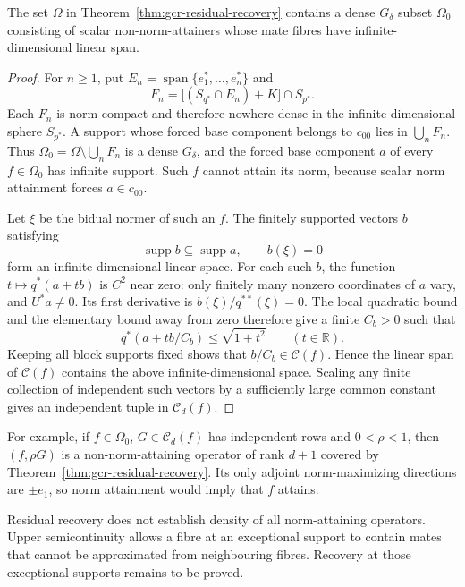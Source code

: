 \documentclass[10pt]{amsart}
\newcommand{\supp}{\operatorname{supp}}
\newcommand{\R}{\mathbb R}
\newcommand{\Cset}{\mathcal C}
\begin{document}
\begin{proposition}
\label{prop:gcr-nonvacuity}
The set $\Omega$ in Theorem~\ref{thm:gcr-residual-recovery}
contains a dense $G_\delta$ subset $\Omega_0$ consisting of
scalar non-norm-attainers whose mate fibres have
infinite-dimensional linear span.
\end{proposition}
\begin{proof}
For $n\ge1$, put $E_n=\operatorname{span}\{e_1^*,\ldots,e_n^*\}$
and
\[
 F_n=\big[(S_{q^*}\cap E_n)+K\big]\cap S_{p^*}.
\]
Each $F_n$ is norm compact and therefore nowhere dense in
the infinite-dimensional sphere $S_{p^*}$. A support whose
forced base component belongs to $c_{00}$ lies in
$\bigcup_nF_n$. Thus
$\Omega_0=\Omega\setminus\bigcup_nF_n$ is a dense $G_\delta$,
and the forced base component $a$ of every $f\in\Omega_0$
has infinite support. Such $f$ cannot attain its norm,
because scalar norm attainment forces $a\in c_{00}$.

Let $\xi$ be the bidual normer of such an $f$.
The finitely supported vectors $b$ satisfying
\[
 \supp b\subseteq\supp a,\qquad b(\xi)=0
\]
form an infinite-dimensional linear space. For each such $b$,
the function $t\mapsto q^*(a+tb)$ is $C^2$ near zero:
only finitely many nonzero coordinates of $a$ vary, and
$U^*a\ne0$. Its first derivative is
$b(\xi)/q^{**}(\xi)=0$. The local quadratic bound and the
elementary bound away from zero therefore give a finite
$C_b>0$ such that
\[
 q^*(a+tb/C_b)\le\sqrt{1+t^2}\qquad(t\in\R).
\]
Keeping all block supports fixed shows that
$b/C_b\in\Cset(f)$. Hence the linear span of $\Cset(f)$
contains the above infinite-dimensional space.
Scaling any finite collection of independent such vectors
by a sufficiently large common constant gives an independent
tuple in $\Cset_d(f)$.
\end{proof}

For example, if $f\in\Omega_0$, $G\in\Cset_d(f)$ has
independent rows and $0<\rho<1$, then $(f,\rho G)$ is a
non-norm-attaining operator of rank $d+1$ covered by
Theorem~\ref{thm:gcr-residual-recovery}. Its only adjoint
norm-maximizing directions are $\pm e_1$, so norm attainment
would imply that $f$ attains.

Residual recovery does not establish density of all
norm-attaining operators. Upper semicontinuity allows a
fibre at an exceptional support to contain mates that cannot
be approximated from neighbouring fibres. Recovery at those
exceptional supports remains to be proved.
\end{document}

